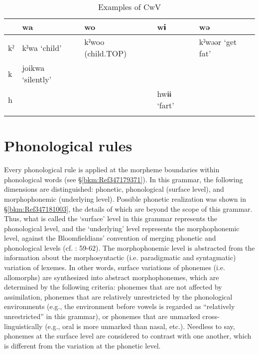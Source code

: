 \begin{table}
\caption{Examples of CwV}
\begin{tabularx}{\textwidth}{lllQl}
\lsptoprule
& {wa}    & {wo}   & {wɨ}   & {wə}  \\\midrule
{kˀ} & {kˀwa}  {‘child’} & {kˀwoo}  {(child.TOP)}  &    & {kˀwəər}  {‘get fat’}\\
{k} & {joikwa}  {‘silently’}            \\
{h}  &                       &                        & {hwɨɨ}  {‘fart’}    \\
\lspbottomrule
\end{tabularx}
\end{table}

\section{Phonological rules}
\hypertarget{RefHeadingToc395696977}{}\label{bkm:Ref302723494}
Every phonological rule is applied at the morpheme boundaries within phonological words (see §\ref{bkm:Ref347179371}). In this grammar, the following dimensions are distinguished: phonetic, phonological (surface level), and morphophonemic (underlying level). Possible phonetic realization was shown in §\ref{bkm:Ref347181003}, the details of which are beyond the scope of this grammar. Thus, what is called the ‘surface’ level in this grammar represents the phonological level, and the ‘underlying’ level represents the morphophonemic level, against the Bloomfieldians’ convention of merging phonetic and phonological levels (cf. \citealt{Lass1984}: 59-62). The morphophonemic level is abstracted from the information about the morphosyntactic (i.e. paradigmatic and syntagmatic) variation of lexemes. In other words, surface variations of phonemes (i.e. allomorphs) are synthesized into abstract morphophonemes, which are determined by the following criteria:  phonemes that are not affected by assimilation,  phonemes that are relatively unrestricted by the phonological environments (e.g., the environment before vowels is regarded as “relatively unrestricted” in this grammar), or  phonemes that are unmarked cross-linguistically (e.g., oral is more unmarked than nasal, etc.). Needless to say, phonemes at the surface level are considered to contrast with one another, which is different from the variation at the phonetic level.

